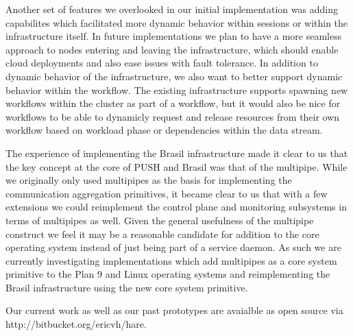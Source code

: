 Another set of features we overlooked in our initial 
implementation was adding capabilites which facilitated
more dynamic behavior within sessions or within the
infrastructure itself.  In future implementations we
plan to have a more seamless approach to nodes entering
and leaving the infrastructure, which should enable
cloud deployments and also ease issues with fault tolerance.
In addition to dynamic behavior of the infrastructure, we
also want to better support dynamic behavior within the
workflow.  The existing infrastructure supports spawning
new workflows within the cluster as part of a workflow,
but it would also be nice for workflows to be able to
dynamicly request and release resources from their own
workflow based on workload phase or dependencies
within the data stream.

The experience of implementing the Brasil infrastructure
made it clear to us that the key concept at the core
of PUSH and Brasil was that of the multipipe.  While we
originally only used multipipes as the basis for implementing the
communication aggregation primitives, it became clear to
us that with a few extensions  we could reimplement the 
control plane and monitoring subsystems in terms of 
multipipes as well.  Given the general usefulness of
the multipipe construct we feel it may be a reasonable
candidate for addition to the core operating system 
instead of just being part of a service daemon.  As
such we are currently investigating implementations which
add multipipes as a core system primitive to the Plan 9
and Linux operating systems and reimplementing the Brasil
infrastructure using the new core system primitive.

Our current work as well as our past prototypes are
avaialble as open source via 
http://bitbucket.org/ericvh/hare.

